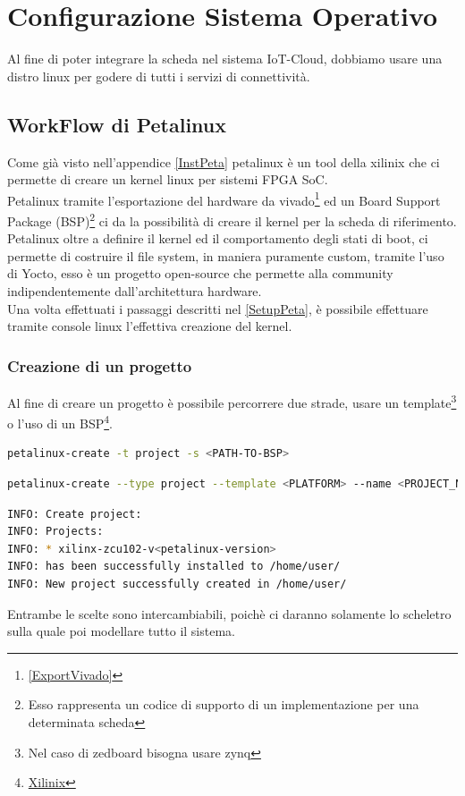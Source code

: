 \chapter{Configurazione Sistema Operativo}
Al fine di poter integrare la scheda nel sistema IoT-Cloud, dobbiamo usare una distro linux per godere di tutti i servizi di connettività.
\section{WorkFlow di Petalinux}
Come già visto nell'appendice \ref{InstPeta} petalinux è un tool della xilinix che ci permette di creare un kernel linux per sistemi FPGA SoC.\\
Petalinux tramite l'esportazione del hardware da vivado\footnote{\ref{ExportVivado}} ed un Board Support Package (BSP)\footnote{Esso rappresenta un codice di supporto di un implementazione per una determinata scheda} ci da la possibilità di creare il kernel per la scheda di riferimento.\\
Petalinux oltre a definire il kernel ed il comportamento degli stati di boot, ci permette di costruire il file system, in maniera puramente custom, tramite l'uso di Yocto, esso è un progetto open-source che permette alla community indipendentemente dall'architettura hardware.\\
Una volta effettuati i passaggi descritti nel \ref{SetupPeta}, è possibile effettuare tramite console linux l'effettiva creazione del kernel.
\subsection{Creazione di un progetto}
Al fine di creare un progetto è possibile percorrere due strade, usare un template\footnote{Nel caso di zedboard bisogna usare zynq} o l'uso di un BSP\footnote{\href{https://www.xilinx.com/member/forms/download/xef.html?filename=avnet-digilent-zedboard-v2021.2-final.bsp}{Xilinix}}.
\begin{lstlisting}[language=sh, label=lst:sh, caption={Comando creazione progetto con BSP}]
petalinux-create -t project -s <PATH-TO-BSP>
\end{lstlisting}
\begin{lstlisting}[language=sh, label=lst:sh, caption={Comando creazione progetto con il template}]
petalinux-create --type project --template <PLATFORM> --name <PROJECT_NAME> 
\end{lstlisting}
\begin{lstlisting}[language=sh, label=lst:sh, caption={Output atteso}]
INFO: Create project:
INFO: Projects:
INFO: * xilinx-zcu102-v<petalinux-version>
INFO: has been successfully installed to /home/user/
INFO: New project successfully created in /home/user/
\end{lstlisting}
Entrambe le scelte sono intercambiabili, poichè ci daranno solamente lo scheletro sulla quale poi modellare tutto il sistema.
